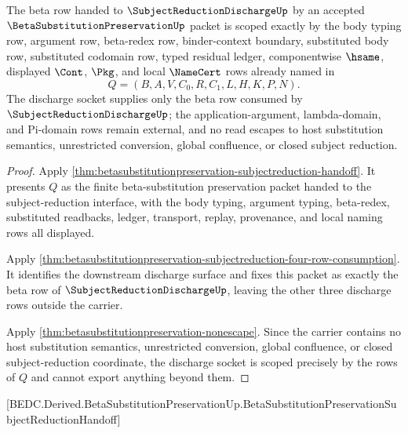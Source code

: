 \begin{theorem}
\label{thm:betasubstitutionpreservation-scoped-discharge-socket}
The beta row handed to $\SubjectReductionDischargeUp$ by an accepted $\BetaSubstitutionPreservationUp$ packet is scoped exactly by the body typing row, argument row, beta-redex row, binder-context boundary, substituted body row, substituted codomain row, typed residual ledger, componentwise $\hsame$, displayed $\Cont$, $\Pkg$, and local $\NameCert$ rows already named in
$$
Q=(B,A,V,C_0,R,C_1,L,H,K,P,N).
$$
The discharge socket supplies only the beta row consumed by $\SubjectReductionDischargeUp$; the application-argument, lambda-domain, and Pi-domain rows remain external, and no read escapes to host substitution semantics, unrestricted conversion, global confluence, or closed subject reduction.
\end{theorem}
\begin{proof}
Apply \autoref{thm:betasubstitutionpreservation-subjectreduction-handoff}. It presents $Q$ as the finite beta-substitution preservation packet handed to the subject-reduction interface, with the body typing, argument typing, beta-redex, substituted readbacks, ledger, transport, replay, provenance, and local naming rows all displayed.

Apply \autoref{thm:betasubstitutionpreservation-subjectreduction-four-row-consumption}. It identifies the downstream discharge surface and fixes this packet as exactly the beta row of $\SubjectReductionDischargeUp$, leaving the other three discharge rows outside the carrier.

Apply \autoref{thm:betasubstitutionpreservation-nonescape}. Since the carrier contains no host substitution semantics, unrestricted conversion, global confluence, or closed subject-reduction coordinate, the discharge socket is scoped precisely by the rows of $Q$ and cannot export anything beyond them.
\end{proof}

[BEDC.Derived.BetaSubstitutionPreservationUp.BetaSubstitutionPreservationSubjectReductionHandoff]

